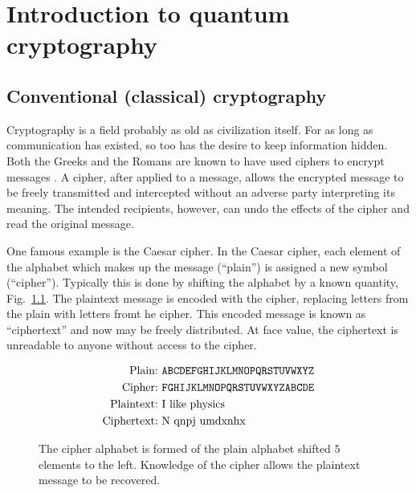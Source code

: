 \chapter{Introduction to quantum cryptography}\label{chapter:crypto_intro}

\section{Conventional (classical) cryptography}

Cryptography is a field probably as old as civilization itself. For as long as communication has existed, so too has the desire to keep information hidden. Both the Greeks and the Romans are known to have used ciphers to encrypt messages \cite{Singh2000}. A cipher, after applied to a message, allows the encrypted message to be freely transmitted and intercepted without an adverse party interpreting its meaning. The intended recipients, however, can undo the effects of the cipher and read the original message. 

One famous example is the Caesar cipher. In the Caesar cipher, each element of the alphabet which makes up the message (``plain'') is assigned a new symbol (``cipher''). Typically this is done by shifting the alphabet by a known quantity, Fig.~\ref{fig:caesar}. The plaintext message is encoded with the cipher, replacing letters from the plain with letters fromt he cipher. This encoded message is known as ``ciphertext'' and now may be freely distributed. At face value, the ciphertext is unreadable to anyone without access to the cipher.

\begin{figure}[htp]
\centering
\captionsetup{width=0.8\linewidth}
\begin{framed}
\begin{align*}
\text{Plain:} &\text{  \texttt{ABCDEFGHIJKLMNOPQRSTUVWXYZ}} \\
\text{Cipher:} &\text{  \texttt{FGHIJKLMNOPQRSTUVWXYZABCDE}} \\
\text{Plaintext:} &\text{  I like physics} \\
\text{Ciphertext:} &\text{  N qnpj umdxnhx}
\end{align*}
\end{framed}
\caption{\label{fig:caesar} The cipher alphabet is formed of the plain alphabet shifted $5$ elements to the left. Knowledge of the cipher allows the plaintext message to be recovered.}
\end{figure} %


